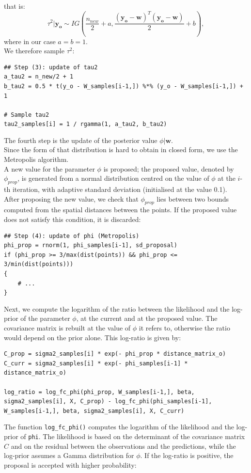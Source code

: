 \documentclass[a4paper,12pt]{article}
\begin{document}
that is:
\begin{equation*}
    \tau^2|\mathbf{y_o} \sim IG\left(\frac{n_{new}}{2} + a, \frac{(\mathbf{y_o} - \mathbf{w})^T (\mathbf{y_o} - \mathbf{w})}{2} + b \right),
\end{equation*}
where in our case \(a = b = 1\).\\
We therefore sample \(\tau^2\):
\begin{lstlisting}[style=R]
## Step (3): update of tau2
a_tau2 = n_new/2 + 1
b_tau2 = 0.5 * t(y_o - W_samples[i-1,]) %*% (y_o - W_samples[i-1,]) + 1

# Sample tau2
tau2_samples[i] = 1 / rgamma(1, a_tau2, b_tau2)
\end{lstlisting}
The fourth step is the update of the posterior value \(\phi|\mathbf{w}\). \\
Since the form of that distribution is hard to obtain in closed form, we use the Metropolis algorithm. \\
A new value for the parameter \(\phi\) is proposed; the proposed value, denoted by \(\phi_{prop}\), is generated from a normal distribution centred on the value of \(\phi\) at the \(i\)-th iteration, with adaptive standard deviation (initialised at the value 0.1). \\
After proposing the new value, we check that \(\phi_{prop}\) lies between two bounds computed from the spatial distances between the points.
If the proposed value does not satisfy this condition, it is discarded:
\begin{lstlisting}[style=R]
## Step (4): update of phi (Metropolis)
phi_prop = rnorm(1, phi_samples[i-1], sd_proposal)
if (phi_prop >= 3/max(dist(points)) && phi_prop <= 3/min(dist(points)))
{
    # ...
}
\end{lstlisting}
Next, we compute the logarithm of the ratio between the likelihood and the log-prior of the parameter \(\phi\), at the current and at the proposed value. The covariance matrix is rebuilt at the value of \(\phi\) it refers to, otherwise the ratio would depend on the prior alone. This log-ratio is given by:
\begin{lstlisting}[style=R]
C_prop = sigma2_samples[i] * exp(- phi_prop * distance_matrix_o)
C_curr = sigma2_samples[i] * exp(- phi_samples[i-1] * distance_matrix_o)

log_ratio = log_fc_phi(phi_prop, W_samples[i-1,], beta, sigma2_samples[i], X, C_prop) - log_fc_phi(phi_samples[i-1], W_samples[i-1,], beta, sigma2_samples[i], X, C_curr)
\end{lstlisting}
The function \texttt{log\_fc\_phi()} computes the logarithm of the likelihood and the log-prior of \texttt{phi}. The likelihood is based on the determinant of the covariance matrix \(C\) and on the residual between the observations and the predictions, while the log-prior assumes a Gamma distribution for \(\phi\). If the log-ratio is positive, the proposal is accepted with higher probability:
\end{document}
